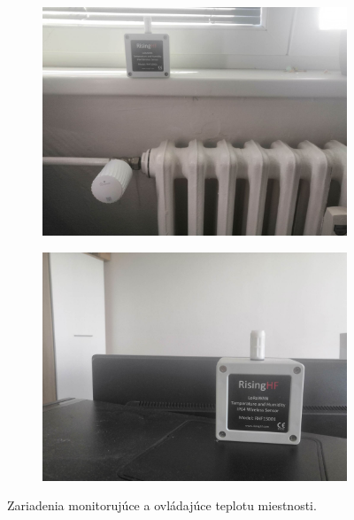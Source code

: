 \begin{figure}[H]
    \centering
    \begin{subfigure}[b]{0.45\textwidth}
        \includegraphics[width=\textwidth]{obrazky-figures/dev_picture_1.jpg}
    \end{subfigure}
    \begin{subfigure}[b]{0.45\textwidth}
        \includegraphics[width=\textwidth]{obrazky-figures/dev_picture_2.jpg}
    \end{subfigure}
    \caption{Zariadenia monitorujúce a ovládajúce teplotu miestnosti.}
    \label{fig:test_device}
\end{figure}


